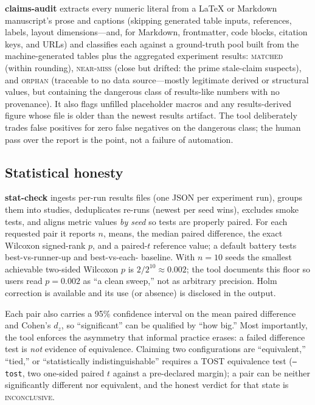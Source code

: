 \documentclass[11pt]{article}
\begin{document}
\textbf{claims-audit} extracts every numeric literal from a LaTeX or Markdown
manuscript's prose and captions (skipping generated table inputs, references,
labels, layout dimensions---and, for Markdown, frontmatter, code blocks,
citation keys, and URLs) and classifies each against a ground-truth pool built from
the machine-generated tables plus the aggregated experiment results:
\textsc{matched} (within rounding), \textsc{near-miss} (close but drifted:
the prime stale-claim suspects), and \textsc{orphan} (traceable to no data
source---mostly legitimate derived or structural values, but containing the
dangerous class of results-like numbers with no provenance). It also flags
unfilled placeholder macros and any results-derived figure whose file is older
than the newest results artifact. The tool deliberately trades false positives
for zero false negatives on the dangerous class; the human pass over the
report is the point, not a failure of automation.

\subsection{Statistical honesty}
\label{sec:stat}

\textbf{stat-check} ingests per-run results files (one JSON per experiment
run), groups them into studies, deduplicates re-runs (newest per seed wins),
excludes smoke tests, and aligns metric values \emph{by seed} so tests are
properly paired. For each requested pair it reports $n$, means, the median
paired difference, the exact Wilcoxon signed-rank $p$, and a paired-$t$
reference value; a default battery tests best-vs-runner-up and best-vs-each-%
baseline. With $n{=}10$ seeds the smallest achievable two-sided Wilcoxon $p$
is $2/2^{10} \approx 0.002$; the tool documents this floor so users read
$p=0.002$ as ``a clean sweep,'' not as arbitrary precision. Holm correction is
available and its use (or absence) is disclosed in the output.

Each pair also carries a 95\% confidence interval on the mean paired
difference and Cohen's $d_z$, so ``significant'' can be qualified by ``how
big.'' Most importantly, the tool enforces the asymmetry that informal
practice erases: a failed difference test is \emph{not} evidence of
equivalence. Claiming two configurations are ``equivalent,'' ``tied,'' or
``statistically indistinguishable'' requires a TOST equivalence test
(\texttt{--tost}, two one-sided paired $t$ against a pre-declared margin);
a pair can be neither significantly different nor equivalent, and the honest
verdict for that state is \textsc{inconclusive}.
\end{document}
